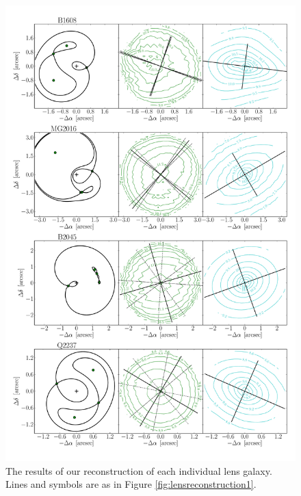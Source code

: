 \documentclass[useAMS,usenatbib]{mn2e}
\begin{document}
\begin{figure}
  \centering
  \includegraphics[width=.8\linewidth]{Figures/AllLenses33.pdf}
  \caption[width=.65\linewidth]{The results of our reconstruction of each individual lens galaxy. Lines and symbols are as in Figure \ref{fig:lensreconstruction1}.}
  \label{fig:lensreconstruction3}
\end{figure}
\end{document}
